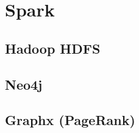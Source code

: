 \section{Spark}
\label{sec:spark}

\subsection{Hadoop HDFS}
\label{sec:hadoop HDFS}

\subsection{Neo4j}
\label{sec:neo4j}

\subsection{Graphx (PageRank)}
\label{sec:graphx (PageRank)}
